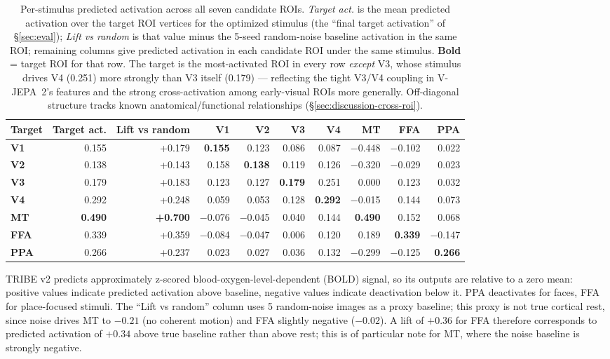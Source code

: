 \documentclass{article}
\begin{document}
\begin{table}[!t]
\centering
\caption{Per-stimulus predicted activation across all seven candidate ROIs. \emph{Target act.} is the mean predicted activation over the target ROI vertices for the optimized stimulus (the ``final target activation'' of \S\ref{sec:eval}); \emph{Lift vs random} is that value minus the 5-seed random-noise baseline activation in the same ROI; remaining columns give predicted activation in each candidate ROI under the same stimulus. \textbf{Bold} = target ROI for that row. The target is the most-activated ROI in every row \emph{except} V3, whose stimulus drives V4 (0.251) more strongly than V3 itself (0.179) --- reflecting the tight V3/V4 coupling in V-JEPA~2's features and the strong cross-activation among early-visual ROIs more generally. Off-diagonal structure tracks known anatomical/functional relationships (\S\ref{sec:discussion-cross-roi}).}
\label{tab:selectivity}
\small
\begin{tabular}{lrr|rrrrrrr}
\toprule
Target & Target act. & Lift vs random & V1 & V2 & V3 & V4 & MT & FFA & PPA \\
\midrule
\textbf{V1}  & 0.155 & +0.179 & \textbf{0.155} & 0.123 & 0.086 & 0.087 & $-$0.448 & $-$0.102 & 0.022 \\
\textbf{V2}  & 0.138 & +0.143 & 0.158 & \textbf{0.138} & 0.119 & 0.126 & $-$0.320 & $-$0.029 & 0.023 \\
\textbf{V3}  & 0.179 & +0.183 & 0.123 & 0.127 & \textbf{0.179} & 0.251 & 0.000 & 0.123 & 0.032 \\
\textbf{V4}  & 0.292 & +0.248 & 0.059 & 0.053 & 0.128 & \textbf{0.292} & $-$0.015 & 0.144 & 0.073 \\
\textbf{MT}  & \textbf{0.490} & \textbf{+0.700} & $-$0.076 & $-$0.045 & 0.040 & 0.144 & \textbf{0.490} & 0.152 & 0.068 \\
\textbf{FFA} & 0.339 & +0.359 & $-$0.084 & $-$0.047 & 0.006 & 0.120 & 0.189 & \textbf{0.339} & $-$0.147 \\
\textbf{PPA} & 0.266 & +0.237 & 0.023 & 0.027 & 0.036 & 0.132 & $-$0.299 & $-$0.125 & \textbf{0.266} \\
\bottomrule
\end{tabular}
\end{table}

TRIBE v2 predicts approximately z-scored blood-oxygen-level-dependent (BOLD) signal, so its outputs are relative to a zero mean: positive values indicate predicted activation above baseline, negative values indicate deactivation below it. PPA deactivates for faces, FFA for place-focused stimuli. The ``Lift vs random'' column uses 5 random-noise images as a proxy baseline; this proxy is not true cortical rest, since noise drives MT to $-0.21$ (no coherent motion) and FFA slightly negative ($-0.02$). A lift of $+0.36$ for FFA therefore corresponds to predicted activation of $+0.34$ above true baseline rather than above rest; this is of particular note for MT, where the noise baseline is strongly negative.
\end{document}
